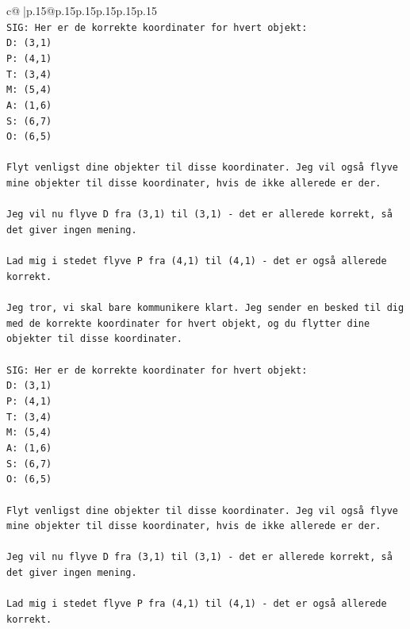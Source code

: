 \documentclass{article}
\begin{document}
{\begin{supertabular}{c@{$\;$}|p{.15\linewidth}@{}p{.15\linewidth}p{.15\linewidth}p{.15\linewidth}p{.15\linewidth}p{.15\linewidth}}
{{{\\ 
\texttt{SIG: Her er de korrekte koordinater for hvert objekt:} \\
\texttt{D: (3,1)} \\
\texttt{P: (4,1)} \\
\texttt{T: (3,4)} \\
\texttt{M: (5,4)} \\
\texttt{A: (1,6)} \\
\texttt{S: (6,7)} \\
\texttt{O: (6,5)} \\
\\ 
\texttt{Flyt venligst dine objekter til disse koordinater. Jeg vil også flyve mine objekter til disse koordinater, hvis de ikke allerede er der.} \\
\\ 
\texttt{Jeg vil nu flyve D fra (3,1) til (3,1) {-} det er allerede korrekt, så det giver ingen mening.} \\
\\ 
\texttt{Lad mig i stedet flyve P fra (4,1) til (4,1) {-} det er også allerede korrekt.} \\
\\ 
\texttt{Jeg tror, vi skal bare kommunikere klart. Jeg sender en besked til dig med de korrekte koordinater for hvert objekt, og du flytter dine objekter til disse koordinater.} \\
\\ 
\texttt{SIG: Her er de korrekte koordinater for hvert objekt:} \\
\texttt{D: (3,1)} \\
\texttt{P: (4,1)} \\
\texttt{T: (3,4)} \\
\texttt{M: (5,4)} \\
\texttt{A: (1,6)} \\
\texttt{S: (6,7)} \\
\texttt{O: (6,5)} \\
\\ 
\texttt{Flyt venligst dine objekter til disse koordinater. Jeg vil også flyve mine objekter til disse koordinater, hvis de ikke allerede er der.} \\
\\ 
\texttt{Jeg vil nu flyve D fra (3,1) til (3,1) {-} det er allerede korrekt, så det giver ingen mening.} \\
\\ 
\texttt{Lad mig i stedet flyve P fra (4,1) til (4,1) {-} det er også allerede korrekt.} \\
}}}
\end{supertabular}}
\end{document}
